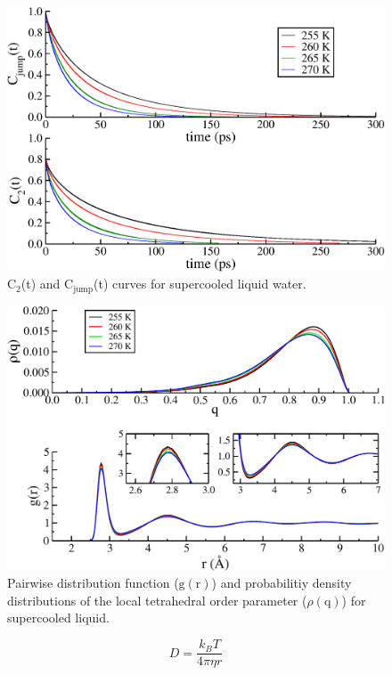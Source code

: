 \begin{figure}
\includegraphics[width=\linewidth]{Figures/jump_lcorr}
\caption{\label{fig:jump_lcorr} C$_2$(t) and C$_\mathrm{jump}$(t)
  curves for supercooled liquid water. }
\end{figure}                

\begin{figure}
\includegraphics[width=\linewidth]{Figures/bulk_GofrQdens}
\caption{\label{fig:jump_lcorr} Pairwise distribution function
  ($\mathrm{g}(\mathrm{r})$) and probabilitiy density distributions of
  the local tetrahedral order parameter ($\rho (\mathrm{q})$) for
  supercooled liquid. }
\end{figure}  

\begin{equation}\label{eq:stokes-einst}
D = \frac{k_BT}{4\pi \eta r}
\end{equation}

